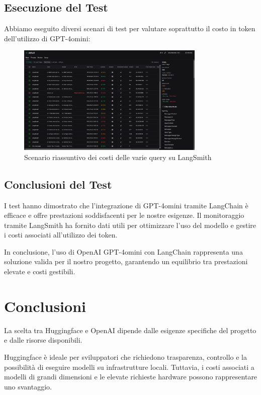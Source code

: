 \documentclass{article}
\begin{document}
\subsection{Esecuzione del Test}
Abbiamo eseguito diversi scenari di test per valutare soprattutto il costo in token dell'utilizzo di GPT-4omini:
\begin{figure}[H]
    \centering
    \includegraphics[width=0.8\textwidth]{img/testing_langsmith.png}
    \caption{Scenario riassuntivo dei costi delle varie query su LangSmith}
    \label{fig:LangSmith_costs_summary}
\end{figure}

\subsection{Conclusioni del Test}
I test hanno dimostrato che l'integrazione di GPT-4omini tramite LangChain è efficace e offre prestazioni soddisfacenti per le nostre esigenze. Il monitoraggio tramite LangSmith ha fornito dati utili per ottimizzare l'uso del modello e gestire i costi associati all'utilizzo dei token.

In conclusione, l'uso di OpenAI GPT-4omini con LangChain rappresenta una soluzione valida per il nostro progetto, garantendo un equilibrio tra prestazioni elevate e costi gestibili.

\section{Conclusioni}
La scelta tra Huggingface e OpenAI dipende dalle esigenze specifiche del progetto e dalle risorse disponibili.

Huggingface è ideale per sviluppatori che richiedono trasparenza, controllo e la possibilità di eseguire modelli su infrastrutture locali. Tuttavia, i costi associati a modelli di grandi dimensioni e le elevate richieste hardware possono rappresentare uno svantaggio.
\end{document}
